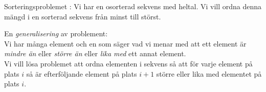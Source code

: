 \documentclass{lecturenotes}
\begin{document}
\begin{Slide}{Sorteringsproblemet}
: Vi har en osorterad sekvens med heltal. Vi vill ordna denna mängd i en sorterad sekvens från minst till störst.
\pause

\vspace{2em}
En \emph{generalisering} av problement: \\ \vspace{1em} Vi har många element och en  som säger vad vi menar med att ett element är \emph{mindre än} eller \emph{större än} eller \emph{lika med} ett annat element. \\ \vspace{1em}
Vi vill lösa problemet att ordna elementen i sekvens så att för varje element på plats $i$ så är efterföljande element på plats $i + 1$ större eller lika med elementet på plats $i$.

\end{Slide} 
%
%
%
%
%
%
%
\end{document}
